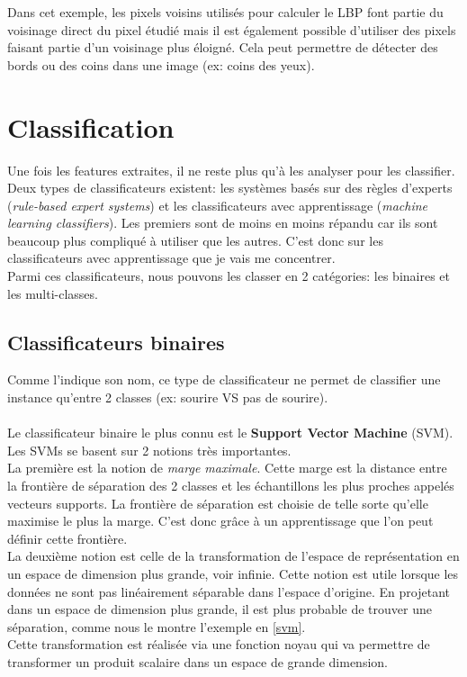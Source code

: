 \documentclass[poster]{polytech/polytech}
\begin{document}
Dans cet exemple, les pixels voisins utilisés pour calculer le LBP font partie du voisinage direct du pixel étudié mais il est également possible d'utiliser des pixels faisant partie d'un voisinage plus éloigné. Cela peut permettre de détecter des bords ou des coins dans une image (ex: coins des yeux).

\newpage
\section{Classification}
Une fois les features extraites, il ne reste plus qu'à les analyser pour les classifier.\\
Deux types de classificateurs existent: les systèmes basés sur des règles d'experts (\textit{rule-based expert systems}) et les classificateurs avec apprentissage (\textit{machine learning classifiers}).
Les premiers sont de moins en moins répandu car ils sont beaucoup plus compliqué à utiliser que les autres. C'est donc sur les classificateurs avec apprentissage que je vais me concentrer.\\
Parmi ces classificateurs, nous pouvons les classer en 2 catégories: les binaires et les multi-classes.

\subsection{Classificateurs binaires}
Comme l'indique son nom, ce type de classificateur ne permet de classifier une instance qu'entre 2 classes (ex: sourire VS pas de sourire).\\
\\
Le classificateur binaire le plus connu est le \textbf{Support Vector Machine} (SVM).\\
Les SVMs se basent sur 2 notions très importantes.\\
La première est la notion de \textit{marge maximale}. Cette marge est la distance entre la frontière de séparation des 2 classes et les échantillons les plus proches appelés vecteurs supports. La frontière de séparation est choisie de telle sorte qu'elle maximise le plus la marge. C'est donc grâce à un apprentissage que l'on peut définir cette frontière.\\
La deuxième notion est celle de la transformation de l'espace de représentation en un espace de dimension plus grande, voir infinie. Cette notion est utile lorsque les données ne sont pas linéairement séparable dans l'espace d'origine. En projetant dans un espace de dimension plus grande, il est plus probable de trouver une séparation, comme nous le montre l'exemple en \autoref{svm}.\\
Cette transformation est réalisée via une fonction noyau qui va permettre de transformer un produit scalaire dans un espace de grande dimension.
\end{document}
